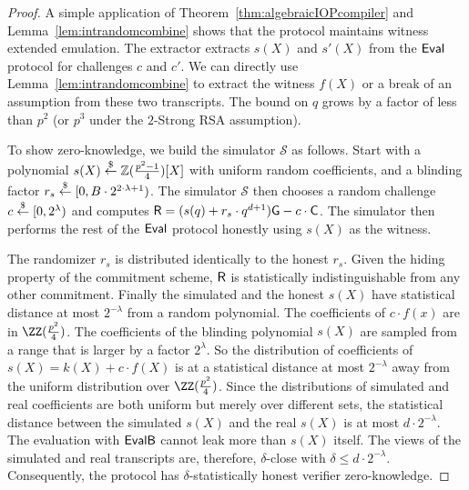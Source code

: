 \begin{proof}
A simple application of Theorem~\ref{thm:algebraicIOPcompiler} and Lemma~\ref{lem:intrandomcombine} shows that the protocol maintains witness extended emulation. The extractor extracts $s(X)$ and $s'(X)$ from the $\textsf{{Eval}}$ protocol for challenges $c$ and $c'$. We can directly use Lemma~\ref{lem:intrandomcombine} to extract the witness $f(X)$ or a break of an assumption from these two transcripts. The bound on $q$ grows by a factor of less than $p^2$ (or $p^3$ under the $2$-Strong RSA assumption).   

To show zero-knowledge, we build the simulator $\mathcal{S}$ as follows. Start with a polynomial $s(X) \overset{\$}{\gets} \mathbb{Z}(\frac{p^2-1}{4})[X]$ with uniform random coefficients, and a blinding factor $r_s \overset{\$}{\gets} [0,B\cdot 2^{2\cdot\lambda+1})$. The simulator $\mathcal{S}$ then chooses a random challenge $c \overset{\$}{\gets} [0,2^\lambda)$ and computes $\gr{R} = (s(q) + r_s \cdot q^{d+1})\gr{g} -c\cdot \gr{C}$. The simulator then performs the rest of the $\textsf{{Eval}}$ protocol honestly using $s(X)$ as the witness. 

The randomizer $r_s$ is distributed identically to the honest $r_s$. Given the hiding property of the commitment scheme, $\gr{R}$ is statistically indistinguishable from any other commitment. Finally the simulated and the honest $s(X)$ have statistical distance at most $2^{-\lambda}$ from a random polynomial. The coefficients of $c\cdot f(x)$ are in $\ZZ(\frac{p^2}{4})$. The coefficients of the blinding polynomial $s(X)$ are sampled from a range that is larger by a factor $2^{\lambda}$. So the distribution of coefficients of $s(X) = k(X) + c \cdot f(X)$ is at a statistical distance at most $2^{-\lambda}$ away from the uniform distribution over $\ZZ(\frac{p^2}{4})$. Since the distributions of simulated and real coefficients are both uniform but merely over different sets, the statistical distance between the simulated $s(X)$ and the real $s(X)$ is at most $d \cdot 2^{-\lambda}$. The evaluation with $\textsf{{EvalB}}$ cannot leak more than $s(X)$ itself. The views of the simulated and real transcripts are, therefore, $\delta$-close with $\delta \leq d \cdot 2^{-\lambda}$. Consequently, the protocol has $\delta$-statistically honest verifier zero-knowledge.
\end{proof}

